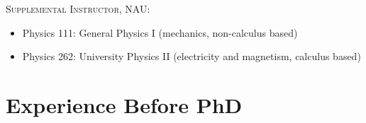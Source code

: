 \documentclass[letterpaper,10pt]{article} %
\begin{document}
\textsc{Supplemental Instructor, NAU:}
\begin{itemize}
\item Physics 111: General Physics I (mechanics, non-calculus based)
\item Physics 262: University Physics II (electricity and magnetism, calculus based)
\end{itemize}



\section{Experience Before PhD}
\end{document}
